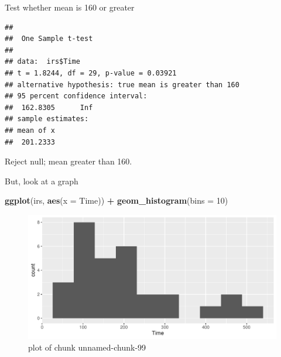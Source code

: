 \documentclass[ignorenonframetext,]{beamer}
\newenvironment{Shaded}{\begin{snugshade}}{\end{snugshade}}
\newcommand{\DataTypeTok}[1]{\textcolor[rgb]{0.13,0.29,0.53}{#1}}
\newcommand{\DecValTok}[1]{\textcolor[rgb]{0.00,0.00,0.81}{#1}}
\newcommand{\KeywordTok}[1]{\textcolor[rgb]{0.13,0.29,0.53}{\textbf{#1}}}
\newcommand{\NormalTok}[1]{#1}
\newcommand{\OperatorTok}[1]{\textcolor[rgb]{0.81,0.36,0.00}{\textbf{#1}}}
\newcommand{\StringTok}[1]{\textcolor[rgb]{0.31,0.60,0.02}{#1}}
\begin{document}
\begin{frame}[fragile]{Test whether mean is 160 or greater}
\protect\hypertarget{test-whether-mean-is-160-or-greater}{}

\begin{Shaded}
\end{Shaded}

\begin{verbatim}
## 
##  One Sample t-test
## 
## data:  irs$Time
## t = 1.8244, df = 29, p-value = 0.03921
## alternative hypothesis: true mean is greater than 160
## 95 percent confidence interval:
##  162.8305      Inf
## sample estimates:
## mean of x 
##  201.2333
\end{verbatim}

Reject null; mean greater than 160.

\end{frame}

\begin{frame}[fragile]{But, look at a graph}
\protect\hypertarget{but-look-at-a-graph}{}

\begin{Shaded}
\begin{Highlighting}[]
\KeywordTok{ggplot}\NormalTok{(irs, }\KeywordTok{aes}\NormalTok{(}\DataTypeTok{x =}\NormalTok{ Time)) }\OperatorTok{+}\StringTok{ }\KeywordTok{geom_histogram}\NormalTok{(}\DataTypeTok{bins =} \DecValTok{10}\NormalTok{)}
\end{Highlighting}
\end{Shaded}

\begin{figure}
\centering
\includegraphics{figure/unnamed-chunk-99-1.pdf}
\caption{plot of chunk unnamed-chunk-99}
\end{figure}

\end{frame}
\end{document}
